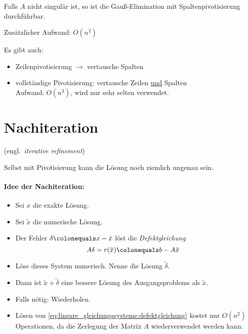 \begin{satz}
Falls $A$ nicht singulär ist, so ist die Gauß-Elimination mit Spaltenpivotisierung durchführbar.
\end{satz}
Zusätzlicher Aufwand: $O(n^2)$

Es gibt auch:
\begin{itemize}
\item Zeilenpivotisierung $\rightarrow$ vertausche Spalten
\item vollständige Pivotisierung: vertausche Zeilen \underline{und} Spalten
\\Aufwand: $O(n^3)$, wird nur sehr selten verwendet.
\end{itemize}



\section{Nachiteration}

(engl.\ \emph{iterative refinement})

\bigskip

Selbst mit Pivotisierung kann die Lösung noch ziemlich ungenau sein.

\bigskip

\paragraph{Idee der Nachiteration:}

\begin{itemize}
 \item Sei $x$ die exakte Lösung.
 \item Sei $\tilde{x}$ die numerische Lösung.
 \item Der Fehler $\delta \colonequals x - \tilde{x}$ löst die \emph{Defektgleichung}
  \begin{equation}
  \label{eq:lineare_gleichungssysteme:defektgleichung}
   A \delta = r(\tilde{x}) \colonequals b - A \tilde{x}
  \end{equation}

 \item Löse dieses System numerisch.  Nenne die Lösung $\tilde{\delta}$.
 \item Dann ist $\tilde{x} + \tilde{\delta}$ eine bessere Lösung des Ausgangsproblems
   als $\tilde{x}$.
 \item Falls nötig: Wiederholen.
 \item Lösen von \eqref{eq:lineare_gleichungssysteme:defektgleichung} kostet nur $O(n^2)$
  Operationen, da die Zerlegung der Matrix $A$ wiederverwendet werden kann.

\end{itemize}

